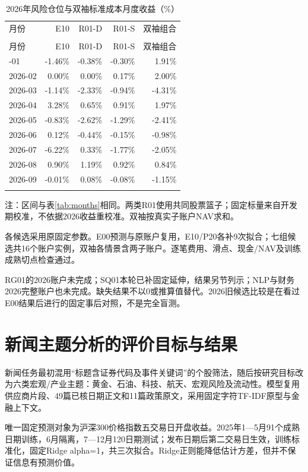 \documentclass[12pt]{article}
\newcommand{\toprule}{\noalign{\hrule height .8pt}}
\newcommand{\midrule}{\noalign{\hrule height .4pt}}
\newcommand{\bottomrule}{\noalign{\hrule height .8pt}}
\begin{document}
{\small
\begin{longtable}{@{}lrrrr@{}}
\caption{2026年风险仓位与双袖标准成本月度收益（\%）}\label{tab:months-risk}\\
\toprule
月份 & E10 & R01-D & R01-S & 双袖组合 \\
\midrule\endfirsthead
\multicolumn{5}{c}{表\thetable（续）}\\\toprule
月份 & E10 & R01-D & R01-S & 双袖组合 \\
\midrule\endhead
2026-01 & -1.46\% & -0.38\% & -0.30\% & 1.91\% \\
2026-02 & 0.00\% & 0.00\% & 0.17\% & 2.00\% \\
2026-03 & -1.14\% & -2.33\% & -0.94\% & -4.31\% \\
2026-04 & 3.28\% & 0.65\% & 0.91\% & 1.97\% \\
2026-05 & -0.83\% & -2.62\% & -1.29\% & -2.41\% \\
2026-06 & 0.12\% & -0.44\% & -0.15\% & -0.98\% \\
2026-07 & -6.22\% & 0.33\% & -1.77\% & -2.05\% \\
2026-08 & 0.90\% & 1.19\% & 0.92\% & 0.84\% \\
2026-09 & -0.01\% & 0.08\% & -0.08\% & -1.15\% \\
\bottomrule\end{longtable}}
{\footnotesize\noindent 注：区间与表\ref{tab:months}相同。两类R01使用共同股票篮子；固定标量来自开发期校准，不依据2026收益重校准。双袖按真实子账户NAV求和。\par}
各候选采用原固定参数。E00预测与原账户复用，E10/P20各补9次拟合；七组候选共16个账户实例，双袖各情景含两子账户。逐笔费用、滑点、现金/NAV及训练成熟切点检查通过。

RG01的2026账户未完成；SQ01本轮已补固定延伸，结果另节列示；NLP与财务2026完整账户也未完成。缺失结果不以0或推算值替代。2026旧候选比较是在看过E00结果后进行的固定事后对照，不是完全盲测。


\section{新闻主题分析的评价目标与结果}
新闻任务最初混用“标题含证券代码及事件关键词”的个股筛法，随后按研究目标改为六类宏观/产业主题：黄金、石油、科技、航天、宏观风险及流动性。模型复用供应商片段、49篇已核日期正文和11篇政策原文，采用固定字符TF-IDF原型与金融上下文。

唯一固定预测对象为沪深300价格指数五交易日开盘收益。2025年1—5月91个成熟日期训练，6月隔离，7—12月120日期测试；发布日期后第二交易日生效，训练标准化，固定Ridge alpha=1，共三次拟合。Ridge正则能降低估计方差，但并不保证信息有预测价值\cite{ref4}。
\end{document}
